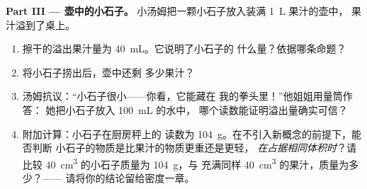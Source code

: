 \begin{problem}
\medskip\noindent\textbf{Part III --- 壶中的小石子。}
小汤姆把一颗小石子放入装满 \qty{1}{L} 果汁的壶中，
果汁溢到了桌上。
\begin{enumerate}[resume]
  \item 擦干的溢出果汁量为 \qty{40}{mL}。它说明了小石子的
        什么量？依据哪条命题？
  \item 将小石子捞出后，壶中还剩
        多少果汁？
  \item 汤姆抗议：“小石子很小——你看，它能藏在
        我的拳头里！”他姐姐用量筒作答：
        她把小石子放入 \qty{100}{mL} 的水中，
        哪个读数能证明溢出量确实可信？
  \item 附加计算：小石子在厨房秤上的
        读数为 \qty{104}{g}。在不引入新概念的前提下，能否判断
        小石子的物质是比果汁的物质更重还是更轻，
        \emph{在占据相同体积时}？请比较
        \qty{40}{cm^3} 的小石子质量为 \qty{104}{g}，与
        充满同样 \qty{40}{cm^3} 的果汁，质量为多少？——
        请将你的结论留给密度一章。
\end{enumerate}
\end{problem}
